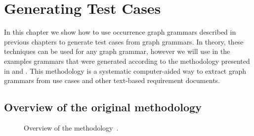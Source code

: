 \chapter{Generating Test Cases}\label{ch:tests}

In this chapter we show how to use  occurrence graph grammars described in previous chapters to generate  test cases from graph grammars. In theory, these techniques can be used for any graph grammar, however we will use in the examples grammars that were generated according to the methodology presented in \cite{Junior2015} and \cite{BezerraWEIT2016}. This methodology is a systematic computer-aided way to extract graph grammars from use
cases and other text-based requirement documents.

\section{Overview of the original methodology}


\begin{figure}[!ht]
  \centering
  \caption{Overview of the methodology~\cite{Junior2015}.}\label{fig:process:doubly-typed-graph}
\end{figure}

